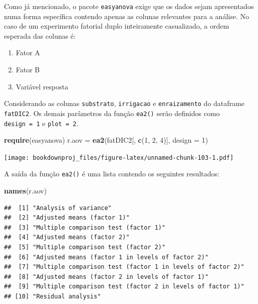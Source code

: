 \documentclass[
]{article}
\newenvironment{Shaded}{\begin{snugshade}}{\end{snugshade}}
\newcommand{\DataTypeTok}[1]{\textcolor[rgb]{0.13,0.29,0.53}{#1}}
\newcommand{\DecValTok}[1]{\textcolor[rgb]{0.00,0.00,0.81}{#1}}
\newcommand{\KeywordTok}[1]{\textcolor[rgb]{0.13,0.29,0.53}{\textbf{#1}}}
\newcommand{\NormalTok}[1]{#1}
\newcommand{\StringTok}[1]{\textcolor[rgb]{0.31,0.60,0.02}{#1}}
\providecommand{\tightlist}{%
  \setlength{\itemsep}{0pt}\setlength{\parskip}{0pt}}
\begin{document}
Como já mencionado, o pacote \texttt{easyanova} exige que os dados sejam apresentados numa forma específica contendo apenas as colunas relevantes para a análise. No caso de um experimento fatorial duplo inteiramente casualizado, a ordem esperada das colunas é:

\begin{enumerate}
\def\labelenumi{\arabic{enumi}.}
\tightlist
\item
  Fator A
\item
  Fator B
\item
  Variável resposta
\end{enumerate}

Considerando as colunas \texttt{substrato}, \texttt{irrigacao} e \texttt{enraizamento} do dataframe \texttt{fatDIC2}. Os demais parâmetros da função \texttt{ea2()} serão definidos como \texttt{design\ =\ 1} e \texttt{plot\ =\ 2}.

\begin{Shaded}
\begin{Highlighting}[]
\KeywordTok{require}\NormalTok{(easyanova)}
\NormalTok{r.aov =}\StringTok{ }\KeywordTok{ea2}\NormalTok{(fatDIC2[, }\KeywordTok{c}\NormalTok{(}\DecValTok{1}\NormalTok{, }\DecValTok{2}\NormalTok{, }\DecValTok{4}\NormalTok{)], }\DataTypeTok{design =} \DecValTok{1}\NormalTok{)}
\end{Highlighting}
\end{Shaded}

\texttt{[image: bookdownproj\_files/figure-latex/unnamed-chunk-103-1.pdf]}

A saída da função \texttt{ea2()} é uma lista contendo os seguintes resultados:

\begin{Shaded}
\begin{Highlighting}[]
\KeywordTok{names}\NormalTok{(r.aov)}
\end{Highlighting}
\end{Shaded}

\begin{verbatim}
##  [1] "Analysis of variance"                                     
##  [2] "Adjusted means (factor 1)"                                
##  [3] "Multiple comparison test (factor 1)"                      
##  [4] "Adjusted means (factor 2)"                                
##  [5] "Multiple comparison test (factor 2)"                      
##  [6] "Adjusted means (factor 1 in levels of factor 2)"          
##  [7] "Multiple comparison test (factor 1 in levels of factor 2)"
##  [8] "Adjusted means (factor 2 in levels of factor 1)"          
##  [9] "Multiple comparison test (factor 2 in levels of factor 1)"
## [10] "Residual analysis"
\end{verbatim}
\end{document}
